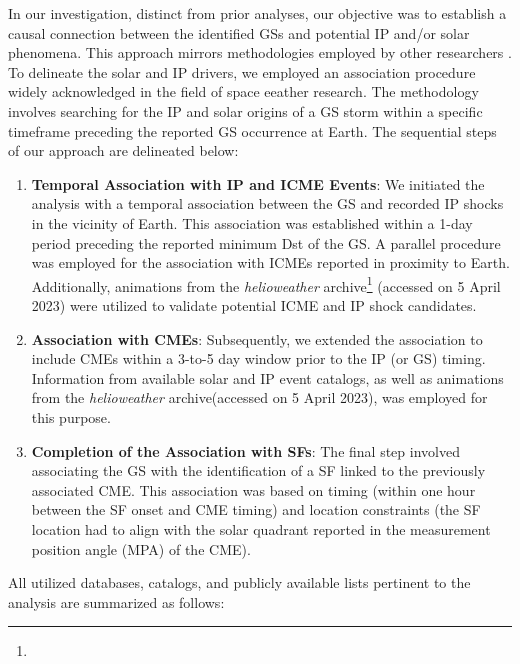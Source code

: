 In our investigation, distinct from prior analyses, our objective was to establish a causal connection between the identified GSs and potential IP and/or solar phenomena. This approach mirrors methodologies employed by other researchers \citep{zhang_2007, gonzalez_2007, gopalswamy_2008, echer_2013, manu_2022}. To delineate the solar and IP drivers, we employed an association procedure widely acknowledged in the field of space eeather research. The methodology involves searching for the IP and solar origins of a GS storm within a specific timeframe preceding the reported GS occurrence at Earth. The sequential steps of our approach are delineated below:

\begin{enumerate}
	\item \textbf{Temporal Association with IP and ICME Events}:
	We initiated the analysis with a temporal association between the GS and recorded IP shocks in the vicinity of Earth. This association was established within a 1-day period preceding the reported minimum Dst of the GS. A parallel procedure was employed for the association with ICMEs reported in proximity to Earth. Additionally, animations from the \textit{helioweather} archive\footnote{\helioweatherurl} (accessed on 5 April 2023) were utilized to validate potential ICME and IP shock candidates.
	
	\item \textbf{Association with CMEs}:
	Subsequently, we extended the association to include CMEs within a 3-to-5 day window prior to the IP (or GS) timing. Information from available solar and IP event catalogs, as well as animations from the \textit{helioweather} archive\footnotemark[\value{footnote}] (accessed on 5 April 2023), was employed for this purpose.
	
	\item \textbf{Completion of the Association with SFs}:
	The final step involved associating the GS with the identification of a SF linked to the previously associated CME. This association was based on timing (within one hour between the SF onset and CME timing) and location constraints (the SF location had to align with the solar quadrant reported in the measurement position angle (MPA) of the CME).
\end{enumerate}

All utilized databases, catalogs, and publicly available lists pertinent to the analysis are summarized as follows:

